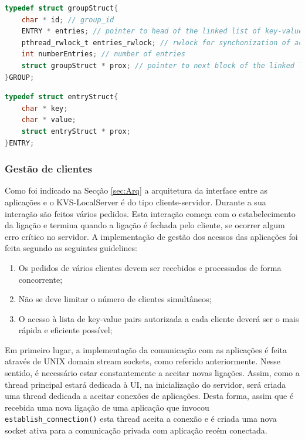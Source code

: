 \begin{lstlisting}[language=C,label={lst_group_struct},caption=Estrutura \texttt{GROUP} para gestão de grupos no KVS-LocalServer.]
typedef struct groupStruct{
    char * id; // group_id
    ENTRY * entries; // pointer to head of the linked list of key-value pairs
    pthread_rwlock_t entries_rwlock; // rwlock for synchonization of access to key-value pairs 
    int numberEntries; // number of entries
    struct groupStruct * prox; // pointer to next block of the linked list
}GROUP;
\end{lstlisting}

\begin{lstlisting}[language=C,label={lst_entry_struct},caption=Estrutura \texttt{ENTRY} para a gestão de key-value pairs no KVS-LocalServer.]
typedef struct entryStruct{
    char * key;
    char * value;
    struct entryStruct * prox;
}ENTRY;
\end{lstlisting}

\subsubsection{Gestão de clientes}\label{sec:gestao_clientes}
Como foi indicado na Secção \ref{sec:Arq} a arquitetura da interface entre as aplicações e o KVS-LocalServer é do tipo cliente-servidor. Durante a sua interação são feitos vários pedidos. Esta interação começa com o estabelecimento da ligação e termina quando a ligação é fechada pelo cliente, se ocorrer algum erro crítico no servidor. A implementação de gestão dos acessos das aplicações foi feita segundo as seguintes guidelines:
\begin{enumerate}[noitemsep]
    \item Os pedidos de vários clientes devem ser recebidos e processados de forma concorrente;
    \item Não se deve limitar o número de clientes simultâneos;
    \item O acesso à lista de key-value pairs autorizada a cada cliente deverá ser o mais rápida e eficiente possível;
\end{enumerate}

Em primeiro lugar, a implementação da comunicação com as aplicações é feita através de UNIX domain stream sockets, como referido anteriormente. Nesse sentido, é necessário estar constantemente a aceitar novas ligações. Assim, como a thread principal estará dedicada à UI, na inicialização do servidor, será criada uma thread dedicada a aceitar conexões de aplicações. Desta forma, assim que é recebida uma nova ligação de uma aplicação que invocou \texttt{establish\_connection()} esta thread aceita a conexão e é criada uma nova socket ativa para a comunicação privada com aplicação recém conectada.

